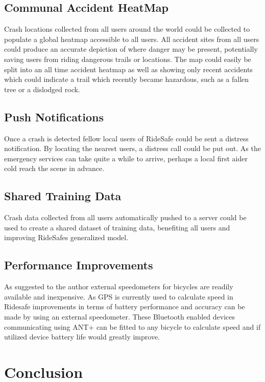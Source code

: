 \subsection *{Communal Accident HeatMap}

Crash locations collected from all users around the world could be collected to populate a global heatmap accessible to all users. All accident sites from all users could produce an accurate depiction of where danger may be present, potentially saving users from riding dangerous trails or locations. The map could easily be split into an all time accident heatmap as well as showing only recent accidents which could indicate a trail which recently became hazardous, such as a fallen tree or a dislodged rock.



\subsection *{Push Notifications}
Once a crash is detected fellow local users of RideSafe could be sent a distress notification. By locating the nearest users, a distress call could be put out. As the emergency services can take quite a while to arrive, perhaps a local first aider cold reach the scene in advance.




\subsection *{Shared Training Data}
Crash data collected from all users automatically pushed to a server could be used to create a shared dataset of training data, benefiting all users and improving RideSafes generalized model.



\subsection *{Performance Improvements}


As suggested to the author external speedometers for bicycles are readily available and inexpensive. As GPS is currently used to calculate speed in Ridesafe improvements in terms of battery performance and accuracy can be made by using an external speedometer. These Bluetooth enabled devices communicating using ANT+ can be fitted to any bicycle to calculate speed and if utilized device battery life would greatly improve. 

\newpage
\section {Conclusion}

